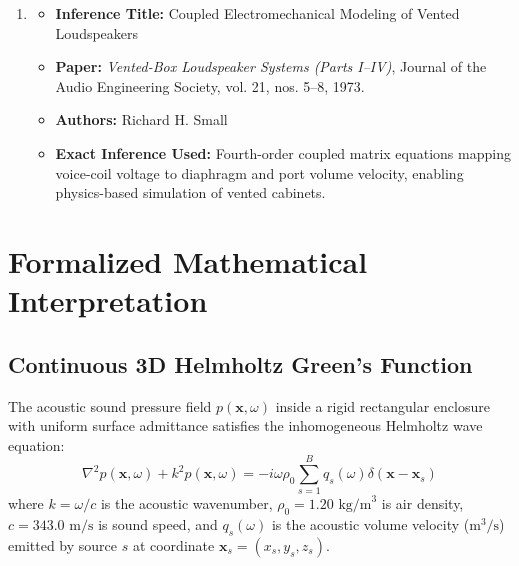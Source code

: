 \documentclass[11pt,a4paper]{article}
\begin{document}
\begin{enumerate}
    \item 
    \begin{itemize}
        \item \textbf{Inference Title:} Coupled Electromechanical Modeling of Vented Loudspeakers
        \item \textbf{Paper:} \textit{Vented-Box Loudspeaker Systems (Parts I--IV)}, Journal of the Audio Engineering Society, vol. 21, nos. 5--8, 1973.
        \item \textbf{Authors:} Richard H. Small
        \item \textbf{Exact Inference Used:} Fourth-order coupled matrix equations mapping voice-coil voltage to diaphragm and port volume velocity, enabling physics-based simulation of vented cabinets.
    \end{itemize}
\end{enumerate}

\section{Formalized Mathematical Interpretation}

\subsection{Continuous 3D Helmholtz Green's Function}
The acoustic sound pressure field $p(\mathbf{x}, \omega)$ inside a rigid rectangular enclosure with uniform surface admittance satisfies the inhomogeneous Helmholtz wave equation:
\begin{equation}
    \nabla^2 p(\mathbf{x}, \omega) + k^2 p(\mathbf{x}, \omega) = -i \omega \rho_0 \sum_{s=1}^B q_s(\omega) \delta(\mathbf{x} - \mathbf{x}_s)
\end{equation}
where $k = \omega / c$ is the acoustic wavenumber, $\rho_0 = 1.20\text{ kg/m}^3$ is air density, $c = 343.0\text{ m/s}$ is sound speed, and $q_s(\omega)$ is the acoustic volume velocity ($\text{m}^3/\text{s}$) emitted by source $s$ at coordinate $\mathbf{x}_s = (x_s, y_s, z_s)$.
\end{document}
